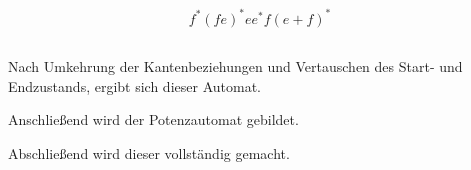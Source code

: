 \documentclass[10pt,a4paper,oneside,ngerman,numbers=noenddot]{scrartcl}
\begin{document}
	\subsection{}
	\subsection{}
	\[f^{*}(fe)^{*}ee^{*}f(e + f)^{*}\]
	\subsection{}
	Nach Umkehrung der Kantenbeziehungen und Vertauschen des Start- und Endzustands, ergibt sich dieser Automat.
	
	Anschließend wird der Potenzautomat gebildet.
	
	Abschließend wird dieser vollständig gemacht.
	\subsection{}
\end{document}

